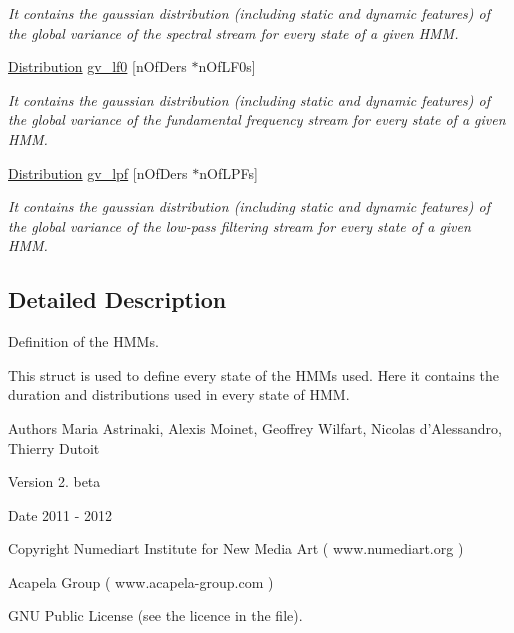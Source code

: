 \begin{DoxyCompactItemize}
\begin{DoxyCompactList}\small\item\em It contains the gaussian distribution (including static and dynamic features) of the global variance of the spectral stream for every state of a given H\-M\-M. \end{DoxyCompactList}\item 
\hypertarget{struct_m_a_g_e_1_1_state_a3d3ecc2eaccfe03e5b30b2919eeb3df2}{\hyperlink{struct_m_a_g_e_1_1_distribution}{Distribution} \hyperlink{struct_m_a_g_e_1_1_state_a3d3ecc2eaccfe03e5b30b2919eeb3df2}{gv\-\_\-lf0} \mbox{[}n\-Of\-Ders $\ast$n\-Of\-L\-F0s\mbox{]}}\label{struct_m_a_g_e_1_1_state_a3d3ecc2eaccfe03e5b30b2919eeb3df2}

\begin{DoxyCompactList}\small\item\em It contains the gaussian distribution (including static and dynamic features) of the global variance of the fundamental frequency stream for every state of a given H\-M\-M. \end{DoxyCompactList}\item 
\hypertarget{struct_m_a_g_e_1_1_state_a849ff0368b589c4e298340450952a39b}{\hyperlink{struct_m_a_g_e_1_1_distribution}{Distribution} \hyperlink{struct_m_a_g_e_1_1_state_a849ff0368b589c4e298340450952a39b}{gv\-\_\-lpf} \mbox{[}n\-Of\-Ders $\ast$n\-Of\-L\-P\-Fs\mbox{]}}\label{struct_m_a_g_e_1_1_state_a849ff0368b589c4e298340450952a39b}

\begin{DoxyCompactList}\small\item\em It contains the gaussian distribution (including static and dynamic features) of the global variance of the low-\/pass filtering stream for every state of a given H\-M\-M. \end{DoxyCompactList}\end{DoxyCompactItemize}


\subsection{Detailed Description}
Definition of the H\-M\-Ms. 

This struct is used to define every state of the H\-M\-Ms used. Here it contains the duration and distributions used in every state of H\-M\-M.

\begin{DoxyAuthor}{Authors}
Maria Astrinaki, Alexis Moinet, Geoffrey Wilfart, Nicolas d'Alessandro, Thierry Dutoit
\end{DoxyAuthor}
\begin{DoxyVersion}{Version}
2. beta 
\end{DoxyVersion}
\begin{DoxyDate}{Date}
2011 -\/ 2012 
\end{DoxyDate}
\begin{DoxyCopyright}{Copyright}
Numediart Institute for New Media Art ( www.\-numediart.\-org ) \par
 Acapela Group ( www.\-acapela-\/group.\-com ) \par
 G\-N\-U Public License (see the licence in the file). 
\end{DoxyCopyright}


